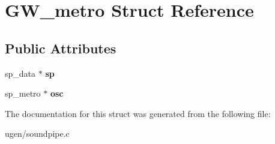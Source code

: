 \hypertarget{structGW__metro}{}\section{G\+W\+\_\+metro Struct Reference}
\label{structGW__metro}
\subsection*{Public Attributes}
\begin{DoxyCompactItemize}
\item 
\hypertarget{structGW__metro_ade22f7a427da14b2467fab1ef31d4e12}{}\label{structGW__metro_ade22f7a427da14b2467fab1ef31d4e12} 
sp\+\_\+data $\ast$ {\bfseries sp}
\item 
\hypertarget{structGW__metro_acfac1b7c121c623c619ae010d3196828}{}\label{structGW__metro_acfac1b7c121c623c619ae010d3196828} 
sp\+\_\+metro $\ast$ {\bfseries osc}
\end{DoxyCompactItemize}


The documentation for this struct was generated from the following file\+:\begin{DoxyCompactItemize}
\item 
ugen/soundpipe.\+c\end{DoxyCompactItemize}
